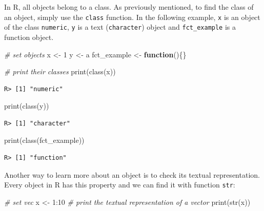 \documentclass[
  12pt,
]{book}
\newenvironment{Shaded}{\begin{snugshade}}{\end{snugshade}}
\newcommand{\CommentTok}[1]{\textcolor[rgb]{0.37,0.37,0.37}{\textit{#1}}}
\newcommand{\ControlFlowTok}[1]{\textcolor[rgb]{0.27,0.27,0.27}{\textbf{#1}}}
\newcommand{\DecValTok}[1]{\textcolor[rgb]{0.06,0.06,0.06}{#1}}
\newcommand{\FunctionTok}[1]{\textcolor[rgb]{0,0,0}{#1}}
\newcommand{\NormalTok}[1]{#1}
\newcommand{\OtherTok}[1]{\textcolor[rgb]{0.37,0.37,0.37}{#1}}
\newcommand{\SpecialCharTok}[1]{\textcolor[rgb]{0,0,0}{#1}}
\newcommand{\StringTok}[1]{\textcolor[rgb]{0.5,0.5,0.5}{#1}}
\begin{document}
In R, all objects belong to a class. As previously mentioned, to find the class of an object, simply use the \texttt{class} function. In the following example, \texttt{x} is an object of the class \texttt{numeric}, \texttt{y} is a text (\texttt{character}) object and \texttt{fct\_example} is a function object. 

\begin{Shaded}
\begin{Highlighting}[]
\CommentTok{\# set objects}
\NormalTok{x }\OtherTok{\textless{}{-}} \DecValTok{1}
\NormalTok{y }\OtherTok{\textless{}{-}} \StringTok{\textquotesingle{}a\textquotesingle{}}
\NormalTok{fct\_example }\OtherTok{\textless{}{-}} \ControlFlowTok{function}\NormalTok{()\{\}}

\CommentTok{\# print their classes}
\FunctionTok{print}\NormalTok{(}\FunctionTok{class}\NormalTok{(x))}
\end{Highlighting}
\end{Shaded}

\begin{verbatim}
R> [1] "numeric"
\end{verbatim}

\begin{Shaded}
\begin{Highlighting}[]
\FunctionTok{print}\NormalTok{(}\FunctionTok{class}\NormalTok{(y))}
\end{Highlighting}
\end{Shaded}

\begin{verbatim}
R> [1] "character"
\end{verbatim}

\begin{Shaded}
\begin{Highlighting}[]
\FunctionTok{print}\NormalTok{(}\FunctionTok{class}\NormalTok{(fct\_example))}
\end{Highlighting}
\end{Shaded}

\begin{verbatim}
R> [1] "function"
\end{verbatim}

Another way to learn more about an object is to check its textual representation. Every object in R has this property and we can find it with function \texttt{str}: 

\begin{Shaded}
\begin{Highlighting}[]
\CommentTok{\# set vec}
\NormalTok{x }\OtherTok{\textless{}{-}} \DecValTok{1}\SpecialCharTok{:}\DecValTok{10}
\CommentTok{\# print the textual representation of a vector}
\FunctionTok{print}\NormalTok{(}\FunctionTok{str}\NormalTok{(x))}
\end{Highlighting}
\end{Shaded}
\end{document}
